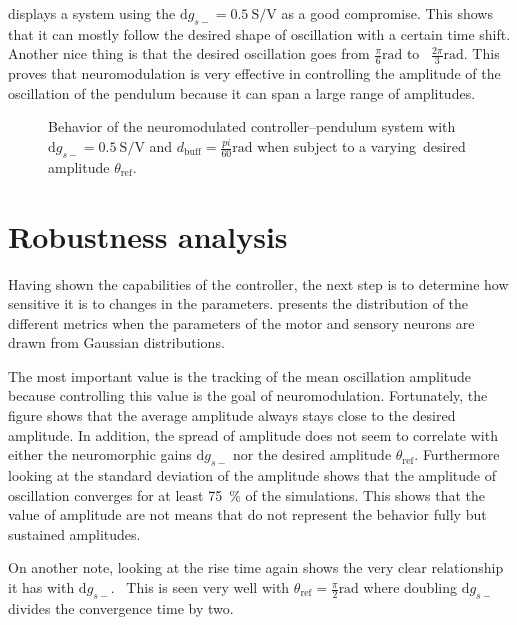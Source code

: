  displays a system using the $\mathrm{d}g_{s-} = \qty{0.5}{\siemens\per\volt}$ as a good compromise.
This shows that it can mostly follow the desired shape of oscillation with a certain time shift.
Another nice thing is that the desired oscillation goes from $\frac{\pi}{6}\unit{\radian}$ to  $\frac{2\pi}{3}\unit{\radian}$.
This proves that neuromodulation is very effective in controlling the amplitude of the oscillation of the pendulum because it can span a large range of amplitudes.

\begin{figure}[!htbp]
    \centering
    \caption{Behavior of the neuromodulated controller–pendulum system with $\mathrm{d}g_{s-} = \qty{0.5}{\siemens\per\volt}$ and $d_\text{buff} = \frac{pi}{60}\unit{\radian}$ when subject to a varying desired amplitude $\theta_\text{ref}$.}
    \label{fig:neuromod_change}
\end{figure}

\section{Robustness analysis}

Having shown the capabilities of the controller, the next step is to determine how sensitive it is to changes in the parameters.
 presents the distribution of the different metrics when the parameters of the motor and sensory neurons are drawn from Gaussian distributions.

The most important value is the tracking of the mean oscillation amplitude because controlling this value is the goal of neuromodulation.
Fortunately, the figure shows that the average amplitude always stays close to the desired amplitude. In addition, the spread of amplitude does not seem to correlate with either the neuromorphic gains $\mathrm{d}g_{s-}$ nor the desired amplitude $\theta_\text{ref}$.
Furthermore looking at the standard deviation of the amplitude shows that the amplitude of oscillation converges for at least \qty{75}{\percent} of the simulations.
This shows that the value of amplitude are not means that do not represent the behavior fully but sustained amplitudes.

On another note, looking at the rise time again shows the very clear relationship it has with $\mathrm{d}g_{s-}$. 
This is seen very well with $\theta_\text{ref} = \frac{\pi}{2}\unit{\radian}$ where doubling $\mathrm{d}g_{s-}$ divides the convergence time by two.

